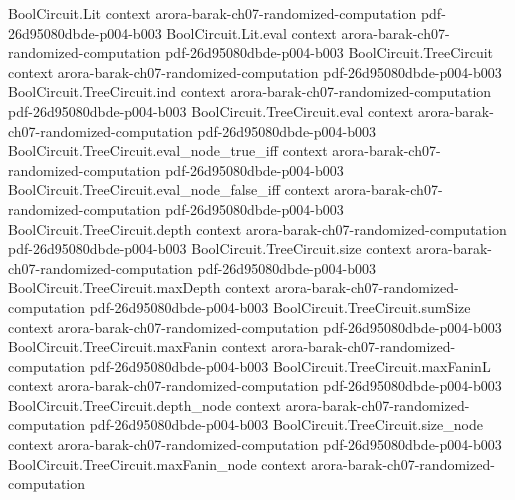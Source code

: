 \begin{theorem}
\label{Randomized.inCoRP_PITLang}
\leanok
{}
\proofstep
  {BoolCircuit.Lit}
  {context}
  {arora-barak-ch07-randomized-computation}
  {pdf-26d95080dbde-p004-b003}
\proofstep
  {BoolCircuit.Lit.eval}
  {context}
  {arora-barak-ch07-randomized-computation}
  {pdf-26d95080dbde-p004-b003}
\proofstep
  {BoolCircuit.TreeCircuit}
  {context}
  {arora-barak-ch07-randomized-computation}
  {pdf-26d95080dbde-p004-b003}
\proofstep
  {BoolCircuit.TreeCircuit.ind}
  {context}
  {arora-barak-ch07-randomized-computation}
  {pdf-26d95080dbde-p004-b003}
\proofstep
  {BoolCircuit.TreeCircuit.eval}
  {context}
  {arora-barak-ch07-randomized-computation}
  {pdf-26d95080dbde-p004-b003}
\proofstep
  {BoolCircuit.TreeCircuit.eval_node_true_iff}
  {context}
  {arora-barak-ch07-randomized-computation}
  {pdf-26d95080dbde-p004-b003}
\proofstep
  {BoolCircuit.TreeCircuit.eval_node_false_iff}
  {context}
  {arora-barak-ch07-randomized-computation}
  {pdf-26d95080dbde-p004-b003}
\proofstep
  {BoolCircuit.TreeCircuit.depth}
  {context}
  {arora-barak-ch07-randomized-computation}
  {pdf-26d95080dbde-p004-b003}
\proofstep
  {BoolCircuit.TreeCircuit.size}
  {context}
  {arora-barak-ch07-randomized-computation}
  {pdf-26d95080dbde-p004-b003}
\proofstep
  {BoolCircuit.TreeCircuit.maxDepth}
  {context}
  {arora-barak-ch07-randomized-computation}
  {pdf-26d95080dbde-p004-b003}
\proofstep
  {BoolCircuit.TreeCircuit.sumSize}
  {context}
  {arora-barak-ch07-randomized-computation}
  {pdf-26d95080dbde-p004-b003}
\proofstep
  {BoolCircuit.TreeCircuit.maxFanin}
  {context}
  {arora-barak-ch07-randomized-computation}
  {pdf-26d95080dbde-p004-b003}
\proofstep
  {BoolCircuit.TreeCircuit.maxFaninL}
  {context}
  {arora-barak-ch07-randomized-computation}
  {pdf-26d95080dbde-p004-b003}
\proofstep
  {BoolCircuit.TreeCircuit.depth_node}
  {context}
  {arora-barak-ch07-randomized-computation}
  {pdf-26d95080dbde-p004-b003}
\proofstep
  {BoolCircuit.TreeCircuit.size_node}
  {context}
  {arora-barak-ch07-randomized-computation}
  {pdf-26d95080dbde-p004-b003}
\proofstep
  {BoolCircuit.TreeCircuit.maxFanin_node}
  {context}
  {arora-barak-ch07-randomized-computation}

\end{theorem}
